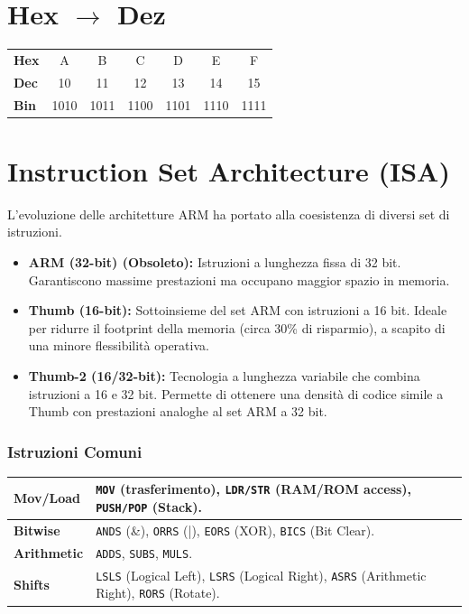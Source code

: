 \section[Hex - Dez]{Hex $\to$ Dez}
\begin{tabular}{l|cccccc}
    \textbf{Hex} & A & B & C & D & E & F \\
    \textbf{Dec} & 10 & 11 & 12 & 13 & 14 & 15 \\
    \textbf{Bin} & 1010 & 1011 & 1100 & 1101 & 1110 & 1111
\end{tabular}

\section{Instruction Set Architecture (ISA)}
\label{subsec:isa_differences}

L'evoluzione delle architetture ARM ha portato alla coesistenza di diversi set di istruzioni.

\begin{itemize}
    \item \textbf{ARM (32-bit) (Obsoleto):} Istruzioni a lunghezza fissa di 32 bit. 
    Garantiscono massime prestazioni ma occupano maggior spazio in memoria.
    \item \textbf{Thumb (16-bit):} Sottoinsieme del set ARM con istruzioni a 16 bit. 
    Ideale per ridurre il footprint della memoria (circa 30\% di risparmio), 
    a scapito di una minore flessibilità operativa.
    \item \textbf{Thumb-2 (16/32-bit):} Tecnologia a lunghezza variabile che combina 
    istruzioni a 16 e 32 bit. Permette di ottenere una densità di codice simile a Thumb 
    con prestazioni analoghe al set ARM a 32 bit.
\end{itemize}

\subsubsection{Istruzioni Comuni}
\begin{tabularx}{\linewidth}{|l|X|}
    \hline
    \textbf{Mov/Load} & \texttt{MOV} (trasferimento), \texttt{LDR/STR} (RAM/ROM access), \texttt{PUSH/POP} (Stack). \\ \hline
    \textbf{Bitwise} & \texttt{ANDS} (\&), \texttt{ORRS} (|), \texttt{EORS} (XOR), \texttt{BICS} (Bit Clear). \\ \hline
    \textbf{Arithmetic} & \texttt{ADDS}, \texttt{SUBS}, \texttt{MULS}. \\ \hline
    \textbf{Shifts} & \texttt{LSLS} (Logical Left), \texttt{LSRS} (Logical Right), \texttt{ASRS} (Arithmetic Right), \texttt{RORS} (Rotate). \\ \hline
\end{tabularx}

